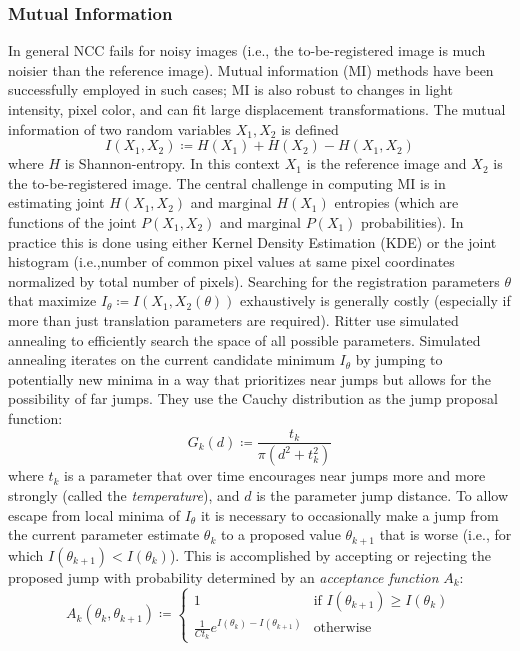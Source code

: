 \subsubsection{Mutual Information}

In general NCC fails for noisy images (i.e., the to-be-registered image is much noisier than the reference image).
%
Mutual information (MI) methods have been successfully employed in such cases; MI is also robust to changes in light intensity, pixel color, and can fit large displacement transformations.
%
The mutual information of two random variables \(X_1, X_2\) is defined
\[
	I (X_1,X_2) \coloneqq H (X_1)+H (X_2)-H (X_1,X_2)
\]
where \(H\) is Shannon-entropy.
%
In this context \(X_1\) is the reference image and \(X_2\) is the to-be-registered image.
%
The central challenge in computing MI is in estimating joint \(H(X_1,X_2)\) and marginal \(H(X_1)\) entropies (which are functions of the joint \(P(X_1,X_2)\) and marginal \(P(X_1)\) probabilities).
%
In practice this is done using either Kernel Density Estimation (KDE) or the joint histogram (i.e.,number of common pixel values at same pixel coordinates normalized by total number of pixels).
%
Searching for the registration parameters \(\theta\) that maximize \(I_{\theta} \coloneqq I(X_1,X_2(\theta))\) exhaustively is generally costly (especially if more than just translation parameters are required).
%
Ritter \etal\cite{ritter1999} use simulated annealing to efficiently search the space of all possible parameters.
%
Simulated annealing iterates on the current candidate minimum \(I_{\theta}\) by jumping to potentially new minima in a way that prioritizes near jumps but allows for the possibility of far jumps.
%
They use the Cauchy distribution as the jump proposal function:
\[
	G_k(d) \coloneqq \frac{t_k}{\pi \left( d^2 + t_k^2 \right)}
\]
where \(t_k\) is a parameter that over time encourages near jumps more and more strongly (called the \textit{temperature}), and \(d\) is the parameter jump distance.
%
To allow escape from local minima of \(I_{\theta}\) it is necessary to occasionally make a jump from the current parameter estimate \(\theta_k\) to a proposed value \(\theta_{k+1}\) that is worse (i.e., for which \(I(\theta_{k+1}) < I(\theta_{k}) \)).
%
This is accomplished by accepting or rejecting the proposed jump with probability determined by an \textit{acceptance function} \(A_k\):
\[
	A_k(\theta_{k}, \theta_{k+1}) \coloneqq \begin{cases}
		1                                                  & \text{if } I(\theta_{k+1}) \geq I(\theta_{k}) \\
		\frac{1}{C t_k}e^{I(\theta_{k}) - I(\theta_{k+1})} & \text{otherwise}
	\end{cases}
\]

